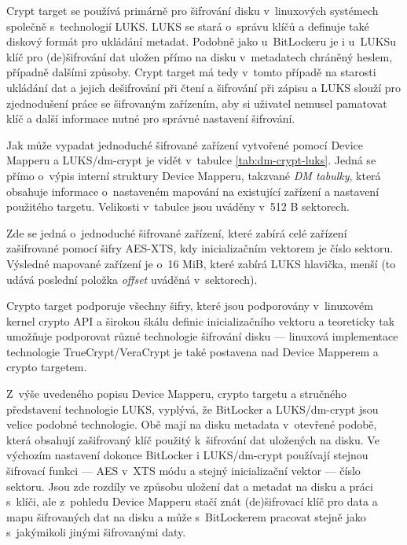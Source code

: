 
Crypt target se používá primárně pro šifrování disku v~linuxových systémech společně s~technologií LUKS. LUKS se stará o~správu klíčů a definuje také diskový formát pro ukládání metadat. Podobně jako u~BitLockeru je i u~LUKSu klíč pro (de)šifrování dat uložen přímo na disku v~metadatech chráněný heslem, případně dalšími způsoby. Crypt target má tedy v~tomto případě na starosti ukládání dat a jejich dešifrování při čtení a šifrování při zápisu a LUKS slouží pro zjednodušení práce se šifrovaným zařízením, aby si uživatel nemusel pamatovat klíč a další informace nutné pro správné nastavení šifrování.\cite{Fruhwirth2005}

Jak může vypadat jednoduché šifrované zařízení vytvořené pomocí Device Mapperu a LUKS/dm-crypt je vidět v~tabulce \ref{tab:dm-crypt-luks}. Jedná se přímo o~výpis interní struktury Device Mapperu, takzvané \emph{DM tabulky}, která obsahuje informace o~nastaveném mapování na existující zařízení a nastavení použitého targetu. Velikosti v~tabulce jsou uváděny v~512 B sektorech.


Zde se jedná o~jednoduché šifrované zařízení, které zabírá celé zařízení zašifrované pomocí šifry AES-XTS, kdy inicializačním vektorem je číslo sektoru. Výsledné mapované zařízení je o~16 MiB, které zabírá LUKS hlavička, menší (to udává poslední položka \emph{offset} uváděná v~sektorech).

Crypto target podporuje všechny šifry, které jsou podporovány v~linuxovém kernel crypto API a širokou škálu definic inicializačního vektoru a teoreticky tak umožňuje podporovat různé technologie šifrování disku --- linuxová implementace technologie TrueCrypt/VeraCrypt je také postavena nad Device Mapperem a crypto targetem\cite{Broz2014}.


Z~výše uvedeného popisu Device Mapperu, crypto targetu a stručného představení technologie LUKS, vyplývá, že BitLocker a LUKS/dm-crypt jsou velice podobné technologie. Obě mají na disku metadata v~otevřené podobě, která obsahují zašifrovaný klíč použitý k~šifrování dat uložených na disku. Ve výchozím nastavení dokonce BitLocker i LUKS/dm-crypt používají stejnou šifrovací funkci --- AES v~XTS módu a stejný inicializační vektor --- číslo sektoru. Jsou zde rozdíly ve způsobu uložení dat a metadat na disku a práci s~klíči, ale z~pohledu Device Mapperu stačí znát (de)šifrovací klíč pro data a mapu šifrovaných dat na disku a může s~BitLockerem pracovat stejně jako s~jakýmikoli jinými šifrovanými daty.

